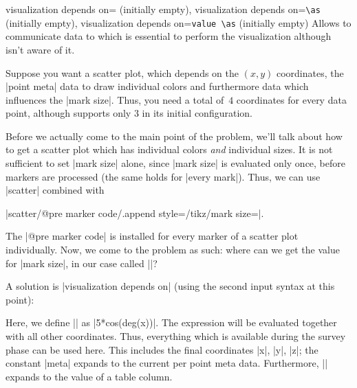\begin{pgfplotskeylist}{%
    visualization depends on= (initially empty),%
    visualization depends on=\texttt{\textbackslash as} (initially empty),
    visualization depends on=\texttt{value }\texttt{\textbackslash as} (initially empty)%
}
    Allows to communicate data to \PGFPlots{} which is essential to perform the
    visualization although \PGFPlots{} isn't aware of it.

    Suppose you want a scatter plot, which depends on the $(x,y)$ coordinates,
    the |point meta| data to draw individual colors and furthermore data which
    influences the |mark size|. Thus, you need a total of~$4$ coordinates for
    every data point, although \PGFPlots{} supports only $3$ in its initial
    configuration.

    Before we actually come to the main point of the problem, we'll talk about
    how to get a scatter plot which has individual colors \emph{and} individual
    sizes. It is not sufficient to set |mark size| alone, since |mark size| is
    evaluated only once, before markers are processed (the same holds for
    |every mark|). Thus, we can use |scatter| combined with

    |scatter/@pre marker code/.append style={/tikz/mark size=\perpointmarksize}|.

    \noindent The |@pre marker code| is installed for every marker of a scatter
    plot individually. Now, we come to the problem as such: where can we get
    the value for |mark size|, in our case called |\perpointmarksize|?

    A solution is |visualization depends on| (using the second input syntax at
    this point):
\begin{codeexample}[]
\end{codeexample}

    Here, we define |\perpointmarksize| as |5*cos(deg(x))|. The expression will
    be evaluated together with all other coordinates. Thus, everything which is
    available during the survey phase can be used here. This includes the final
    coordinates |x|, |y|, |z|; the constant |meta| expands to the current per
    point meta data. Furthermore, |\thisrow| expands to the value
    of a table column.


\end{pgfplotskeylist}
